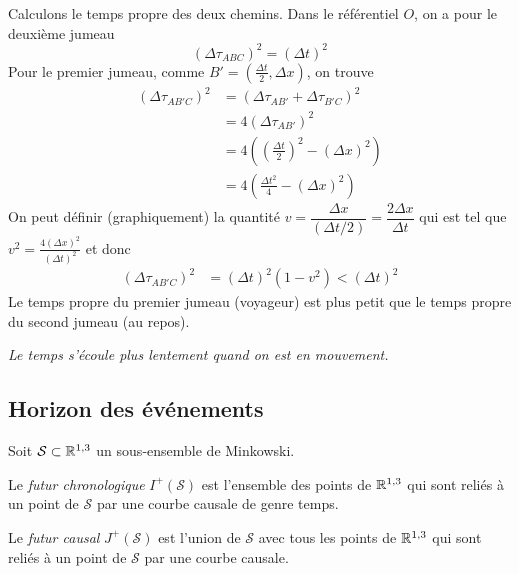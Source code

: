 {Calculons le temps propre des deux chemins. Dans le référentiel $O$, on a pour le deuxième jumeau
\begin{equation}
    (\Delta \tau_{ABC})^2 = (\Delta t)^2
\end{equation} 
Pour le premier jumeau, comme $B'=(\frac{\Delta t}{2},\Delta x)$, on trouve
\begin{align}
        \nonumber
        (\Delta \tau_{AB'C})^2 &= (\Delta \tau_{AB'} + \Delta \tau_{B'C})^2\\
        \nonumber
        &= 4(\Delta \tau_{AB'})^2 \\
        \nonumber
        &= 4 \left(\left(\frac{\Delta t}{2}\right)^2 - (\Delta x)^2\right)\\
        \nonumber
        &= 4 \left(\frac{\Delta t^2}{4} - (\Delta x)^2\right)
    \end{align}
    On peut définir (graphiquement) la quantité $v = \dfrac{\Delta x}{(\Delta t/2)} = \dfrac{2 \Delta x}{\Delta t}$ qui est tel que $v^2 = \frac{4(\Delta x)^2}{(\Delta t)^2}$ et donc
    \begin{align}
        (\Delta \tau_{AB'C})^2 &= (\Delta t)^2(1 - v^2) < (\Delta t)^2
    \end{align}
Le temps propre du premier jumeau (voyageur) est plus petit que le temps propre du second jumeau (au repos). 
\begin{center}
    \textit{Le temps s'écoule plus lentement quand on est en mouvement.}
\end{center}

\subsection{Horizon des événements} 

Soit $\mathcal{S} \subset \mathbb{R}^{1,3}$  un sous-ensemble de Minkowski. 
\begin{theoremframe}
    \begin{defi}
        \label{def:futur chrono}
        Le \emph{futur chronologique} $I^{+}(\mathcal{S})$ est l'ensemble des points de $\mathbb{R}^{1,3}$ qui sont reliés à un point de $\mathcal{S}$ par une courbe causale de genre temps. 
    \end{defi}
\end{theoremframe}
\begin{theoremframe}
    \begin{defi}
        \label{def:futur causal}
        Le \emph{futur causal} $J^{+}(\mathcal{S})$ est l'union de $\mathcal{S}$ avec tous les points de $\mathbb{R}^{1,3}$ qui sont reliés à un point de $\mathcal{S}$ par une courbe causale. 
    \end{defi}
\end{theoremframe}

}
